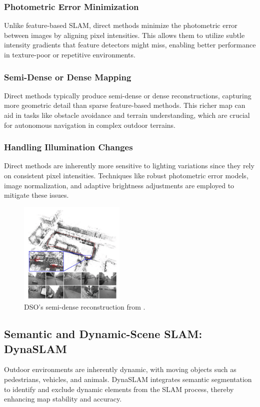 \documentclass[conference]{IEEEtran}
\begin{document}
\subsubsection{Photometric Error Minimization}
Unlike feature-based SLAM, direct methods minimize the photometric error between images by aligning pixel intensities. This allows them to utilize subtle intensity gradients that feature detectors might miss, enabling better performance in texture-poor or repetitive environments.

\subsubsection{Semi-Dense or Dense Mapping}
Direct methods typically produce semi-dense or dense reconstructions, capturing more geometric detail than sparse feature-based methods. This richer map can aid in tasks like obstacle avoidance and terrain understanding, which are crucial for autonomous navigation in complex outdoor terrains.

\subsubsection{Handling Illumination Changes}
Direct methods are inherently more sensitive to lighting variations since they rely on consistent pixel intensities. Techniques like robust photometric error models, image normalization, and adaptive brightness adjustments are employed to mitigate these issues.

\begin{figure}[htbp]
\centerline{\includegraphics[width=0.45\textwidth]{dso.png}}
\caption{DSO’s semi-dense reconstruction from \cite{5}.}
\label{fig:dso}
\end{figure}

\subsection{Semantic and Dynamic-Scene SLAM: DynaSLAM}
Outdoor environments are inherently dynamic, with moving objects such as pedestrians, vehicles, and animals. DynaSLAM \cite{6} integrates semantic segmentation to identify and exclude dynamic elements from the SLAM process, thereby enhancing map stability and accuracy.
\end{document}
